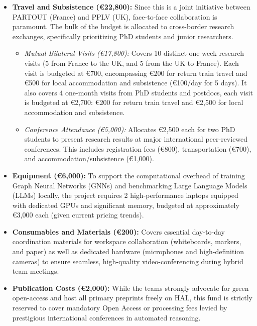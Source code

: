 \documentclass[a4paper]{article}
\begin{document}
\begin{itemize}
    \item \textbf{Travel and Subsistence (\euro 22,800):} Since this is a joint initiative between PARTOUT (France) and PPLV (UK), face-to-face collaboration is paramount. The bulk of the budget is allocated to cross-border research exchanges, specifically prioritizing PhD students and junior researchers.
    \begin{itemize}
        \item \textit{Mutual Bilateral Visits (\euro 17,800):} Covers 10 distinct one-week research visits (5 from France to the UK, and 5 from the UK to France). Each visit is budgeted at \euro 700, encompassing \euro 200 for return train travel and \euro 500 for local accommodation and subsistence (\euro 100/day for 5 days). It also covers 4 one-month visits from PhD students and postdocs, each visit is budgeted at \euro 2,700: \euro 200 for return train travel and \euro 2,500 for local accommodation and subsistence.
        \item \textit{Conference Attendance (\euro 5,000):} Allocates \euro 2,500 each for two PhD students to present research results at major international peer-reviewed conferences. This includes registration fees (\euro 800), transportation (\euro 700), and accommodation/subsistence (\euro 1,000).
    \end{itemize}

    \item \textbf{Equipment (\euro 6,000):} To support the computational overhead of training Graph Neural Networks (GNNs) and benchmarking Large Language Models (LLMs) locally, the project requires 2 high-performance laptops equipped with dedicated GPUs and significant memory, budgeted at approximately \euro 3,000 each (given current pricing trends).

    \item \textbf{Consumables and Materials (\euro 200):} Covers essential day-to-day coordination materials for workspace collaboration (whiteboards, markers, and paper) as well as dedicated hardware (microphones and high-definition cameras) to ensure seamless, high-quality video-conferencing during hybrid team meetings.

    \item \textbf{Publication Costs (\euro 2,000):} While the teams strongly advocate for green open-access and host all primary preprints freely on HAL, this fund is strictly reserved to cover mandatory Open Access or processing fees levied by prestigious international conferences in automated reasoning.


\end{itemize}
\end{document}
